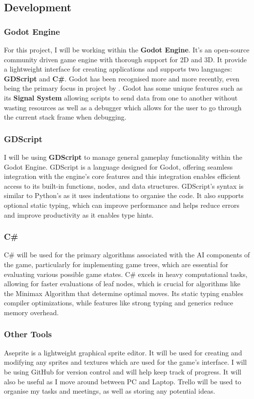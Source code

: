 \documentclass[review]{cmpreport}
\begin{document}
\newpage
\subsection{Development}
\subsubsection{Godot Engine}
For this project, I will be working within the \textbf{Godot Engine}. It's an open-source community driven game engine with thorough support for 2D and 3D. It provide a lightweight interface for creating applications and supports two languages: \textbf{GDScript} and \textbf{C\#}. Godot has been recognised more and more recently, even being the primary focus in project by \cite{salmela2022game}. Godot has some unique features such as its \textbf{Signal System} allowing scripts to send data from one to another without wasting resources as well as a debugger which allows for the user to go through the current stack frame when debugging.

\subsubsection{GDScript}
I will be using \textbf{GDScript} to manage general gameplay functionality within the Godot Engine. GDScript is a language designed for Godot, offering seamless integration with the engine's core features and this integration enables efficient access to its built-in functions, nodes, and data structures. GDScript's syntax is similar to Python's as it uses indentations to organise the code. It also supports optional static typing, which can improve performance and helps reduce errors and improve productivity as it enables type hints.

\subsubsection{C\#}
C\# will be used for the primary algorithms associated with the AI components of the game, particularly for implementing game trees, which are essential for evaluating various possible game states. C\# excels in heavy computational tasks, allowing for faster evaluations of leaf nodes, which is crucial for algorithms like the Minimax Algorithm that determine optimal moves. Its static typing enables compiler optimizations, while features like strong typing and generics reduce memory overhead.

\subsubsection{Other Tools}
Aseprite is a lightweight graphical sprite editor. It will be used for creating and modifying any sprites and textures which are used for the game's interface. I will be using GitHub for version control and will help keep track of progress. It will also be useful as I move around between PC and Laptop. Trello will be used to organise my tasks and meetings, as well as storing any potential ideas.
\end{document}
